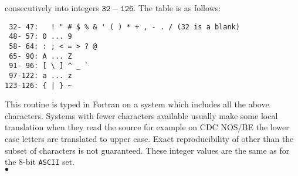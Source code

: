 consecutively into integers $\mathtt{32-126}$. The table is as follows:
\begin{verbatim}
 32- 47:   ! " # $ % & ' ( ) * + , - . / (32 is a blank)
 48- 57: 0 ... 9
 58- 64: : ; < = > ? @
 65- 90: A ... Z
 91- 96: [ \ ] ^ _ `
 97-122: a ... z
123-126: { | } ~
\end{verbatim}
\newpage
\Restrict
This routine is typed in Fortran on a system
which includes all the above characters. Systems with fewer
characters available usually make some local translation when they read
the source for example on CDC NOS/BE the lower case letters are
translated to upper case. Exact reproducibility of other than the subset
of characters is not guaranteed.
\Notes
These integer values are the same as for the 8-bit {\tt ASCII} set.
\\ $\bullet$
